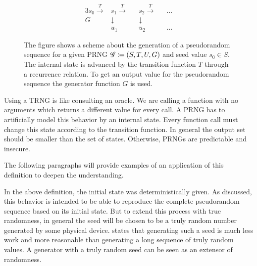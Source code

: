\documentclass{stdlocal}
\begin{document}
    \begin{figure}
      \center
      \begin{minipage}[b]{0.5\textwidth}
      \begin{alignat*}{3}
        s_0 \xrightarrow{T} &s_1 \xrightarrow{T} &&s_2 \xrightarrow{T} &&\ldots \\
        G &\downarrow &&\downarrow \\
        &u_1 &&u_2 &&\ldots
      \end{alignat*}
      \end{minipage}
      \caption[Generation of a Pseudorandom Sequence]{%
        The figure shows a scheme about the generation of a pseudorandom sequence for a given PRNG $\mathscr{G}\coloneqq (S,T,U,G)$ and seed value $s_0\in S$.
        The internal state is advanced by the transition function $T$ through a recurrence relation.
        To get an output value for the pseudorandom sequence the generator function $G$ is used.
      }
      \label{fig:scheme-pseudorandom-sequence}
    \end{figure}

    Using a TRNG is like consulting an oracle.
    We are calling a function with no arguments which returns a different value for every call.
    A PRNG has to artificially model this behavior by an internal state.
    Every function call must change this state according to the transition function.
    In general the output set should be smaller than the set of states.
    Otherwise, PRNGs are predictable and insecure.
    \autocite{oneill2014}

    The following paragraphs will provide examples of an application of this definition to deepen the understanding.

    In the above definition, the initial state was deterministically given.
    As discussed, this behavior is intended to be able to reproduce the complete pseudorandom sequence based on its initial state.
    But to extend this process with true randomness, in general the seed will be chosen to be a truly random number generated by some physical device.
    \textcite{lecuyer1994} states that generating such a seed is much less work and more reasonable than generating a long sequence of truly random values.
    A generator with a truly random seed can be seen as an extensor of randomness.
\end{document}
